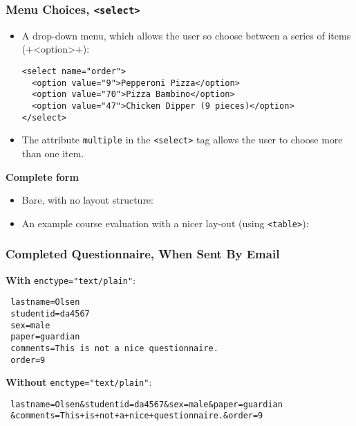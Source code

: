 \documentclass[dvipsnames,handout]{beamer}
\begin{document}
\begin{frame}[fragile]
\frametitle{Menu Choices, \texttt{<select>}}

\begin{itemize}
\item A drop-down menu, which allows the user so choose between a
  series of items (+<option>+):
  \begin{small}
\begin{verbatim}
<select name="order">
  <option value="9">Pepperoni Pizza</option>
  <option value="70">Pizza Bambino</option>
  <option value="47">Chicken Dipper (9 pieces)</option>
</select>
\end{verbatim}
  \end{small}
\item The attribute \verb+multiple+ in the \verb+<select>+ tag allows
  the user to choose more than one item.
\end{itemize}


\textbf{Complete form}

\begin{itemize}
\item Bare, with no layout structure: 
\item An example course evaluation with a nicer lay-out (using
  \verb+<table>+): 
\end{itemize}

\end{frame}

\begin{frame}[fragile]
\frametitle{Completed Questionnaire, When Sent By Email}

\textbf{With} \verb+enctype="text/plain"+:

\begin{small}
\begin{verbatim}
 lastname=Olsen
 studentid=da4567
 sex=male
 paper=guardian
 comments=This is not a nice questionnaire.
 order=9
\end{verbatim}
\end{small}


\textbf{Without} \verb+enctype="text/plain"+:

\begin{small}
\begin{verbatim}
 lastname=Olsen&studentid=da4567&sex=male&paper=guardian
 &comments=This+is+not+a+nice+questionnaire.&order=9
\end{verbatim}
\end{small}
\end{frame}
\end{document}
